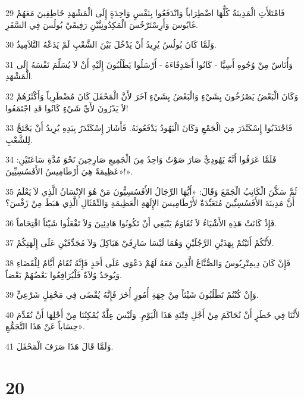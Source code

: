 \par 29 فَامْتَلأَتِ الْمَدِينَةُ كُلُّهَا اضْطِرَاباً وَانْدَفَعُوا بِنَفْسٍ وَاحِدَةٍ إِلَى الْمَشْهَدِ خَاطِفِينَ مَعَهُمْ غَايُوسَ وَأَرِسْتَرْخُسَ الْمَكِدُونِيَّيْنِ رَفِيقَيْ بُولُسَ فِي السَّفَرِ.
\par 30 وَلَمَّا كَانَ بُولُسُ يُرِيدُ أَنْ يَدْخُلَ بَيْنَ الشَّعْبِ لَمْ يَدَعْهُ التَّلاَمِيذُ.
\par 31 وَأُنَاسٌ مِنْ وُجُوهِ أَسِيَّا - كَانُوا أَصْدِقَاءَهُ - أَرْسَلُوا يَطْلُبُونَ إِلَيْهِ أَنْ لاَ يُسَلِّمَ نَفْسَهُ إِلَى الْمَشْهَدِ.
\par 32 وَكَانَ الْبَعْضُ يَصْرُخُونَ بِشَيْءٍ وَالْبَعْضُ بِشَيْءٍ آخَرَ لأَنَّ الْمَحْفَلَ كَانَ مُضْطَرِباً وَأَكْثَرُهُمْ لاَ يَدْرُونَ لأَيِّ شَيْءٍ كَانُوا قَدِ اجْتَمَعُوا!
\par 33 فَاجْتَذَبُوا إِسْكَنْدَرَ مِنَ الْجَمْعِ وَكَانَ الْيَهُودُ يَدْفَعُونَهُ. فَأَشَارَ إِسْكَنْدَرُ بِيَدِهِ يُرِيدُ أَنْ يَحْتَجَّ لِلشَّعْبِ.
\par 34 فَلَمَّا عَرَفُوا أَنَّهُ يَهُودِيٌّ صَارَ صَوْتٌ وَاحِدٌ مِنَ الْجَمِيعِ صَارِخِينَ نَحْوَ مُدَّةِ سَاعَتَيْنِ: «عَظِيمَةٌ هِيَ أَرْطَامِيسُ الأَفَسُسِيِّينَ!».
\par 35 ثُمَّ سَكَّنَ الْكَاتِبُ الْجَمْعَ وَقَالَ: «أَيُّهَا الرِّجَالُ الأَفَسُسِيُّونَ مَنْ هُوَ الإِنْسَانُ الَّذِي لاَ يَعْلَمُ أَنَّ مَدِينَةَ الأَفَسُسِيِّينَ مُتَعَبِّدَةٌ لأَرْطَامِيسَ الإِلَهَةِ الْعَظِيمَةِ وَالتِّمْثَالِ الَّذِي هَبَطَ مِنْ زَفْسَ؟
\par 36 فَإِذْ كَانَتْ هَذِهِ الأَشْيَاءُ لاَ تُقَاوَمُ يَنْبَغِي أَنْ تَكُونُوا هَادِئِينَ وَلاَ تَفْعَلُوا شَيْئاً اقْتِحَاماً.
\par 37 لأَنَّكُمْ أَتَيْتُمْ بِهَذَيْنِ الرَّجُلَيْنِ وَهُمَا لَيْسَا سَارِقَيْ هَيَاكِلَ وَلاَ مُجَدِّفَيْنِ عَلَى إِلَهَتِكُمْ.
\par 38 فَإِنْ كَانَ دِيمِتْرِيُوسُ وَالصُّنَّاعُ الَّذِينَ مَعَهُ لَهُمْ دَعْوَى عَلَى أَحَدٍ فَإِنَّهُ تُقَامُ أَيَّامٌ لِلْقَضَاءِ وَيُوجَدُ وُلاَةٌ فَلْيُرَافِعُوا بَعْضُهُمْ بَعْضاً.
\par 39 وَإِنْ كُنْتُمْ تَطْلُبُونَ شَيْئاً مِنْ جِهَةِ أُمُورٍ أُخَرَ فَإِنَّهُ يُقْضَى فِي مَحْفِلٍ شَرْعِيٍّ.
\par 40 لأَنَّنَا فِي خَطَرٍ أَنْ نُحَاكَمَ مِنْ أَجْلِ فِتْنَةِ هَذَا الْيَوْمِ. وَلَيْسَ عِلَّةٌ يُمْكِنُنَا مِنْ أَجْلِهَا أَنْ نُقَدِّمَ حِسَاباً عَنْ هَذَا التَّجَمُّعِ».
\par 41 وَلَمَّا قَالَ هَذَا صَرَفَ الْمَحْفَلَ.

\chapter{20}

